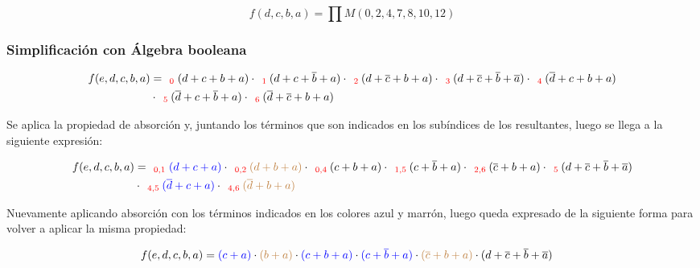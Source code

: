 \begin{equation*}
    f(d,c,b,a) = \prod M(0,2,4,7,8,10,12)
\end{equation*}

\subsubsection{Simplificación con Álgebra booleana}

\begin{equation*}
\begin{align*}
f(e,d,c,b,a) & = _{\ \ \color{red} 0} {(d+c+b+a)}
\cdot _{\ \ \color{red} 1} {(d+c+\overline{b}+a)}
\cdot _{\ \ \color{red} 2} {(d+\overline{c}+b+a)}
\cdot _{\ \ \color{red} 3} {(d+\overline{c}+\overline{b}+\overline{a})}
\cdot _{\ \ \color{red} 4} {(\overline{d}+c+b+a)} \\
& \cdot _{\ \ \color{red} 5} {(\overline{d}+c+\overline{b}+a)}
\cdot _{\ \ \color{red} 6} {(\overline{d}+\overline{c}+b+a)}
\end{align*}
\end{equation*}

Se aplica la propiedad de absorci\'on y, juntando los t\'erminos que son indicados en los sub\'indices de los 
resultantes, luego se llega a la siguiente expresi\'on:

\begin{equation*}
\begin{align*}
f(e,d,c,b,a) & = _{\ \ \color{red} 0,1} {\color{blue} (d+c+a)}
\cdot _{\ \ \color{red} 0,2} {\color{brown} (d+b+a)}
\cdot _{\ \ \color{red} 0,4} {(c+b+a)}
\cdot _{\ \ \color{red} 1,5} {(c+\overline{b}+a)}
\cdot _{\ \ \color{red} 2,6} {(\overline{c}+b+a)}
\cdot _{\ \ \color{red} 5} {(d+\overline{c}+\overline{b}+\overline{a})} \\
& \cdot _{\ \ \color{red} 4,5} {\color{blue} (\overline{d}+c+a)}
\cdot _{\ \ \color{red} 4,6} {\color{brown} (\overline{d}+b+a)}
\end{align*}
\end{equation*}

Nuevamente aplicando absorci\'on con los t\'erminos indicados en los colores azul y marr\'on,
luego queda expresado de la siguiente forma para volver a aplicar la misma propiedad:

\begin{equation*}
\begin{align*}
f(e,d,c,b,a) & = {\color{blue} (c+a)}
\cdot {\color{brown} (b+a)}
\cdot {\color{blue} (c+b+a)}
\cdot {\color{blue} (c+\overline{b}+a)}
\cdot {\color{brown} (\overline{c}+b+a)}
\cdot {(d+\overline{c}+\overline{b}+\overline{a})} 
\end{align*}
\end{equation*}


